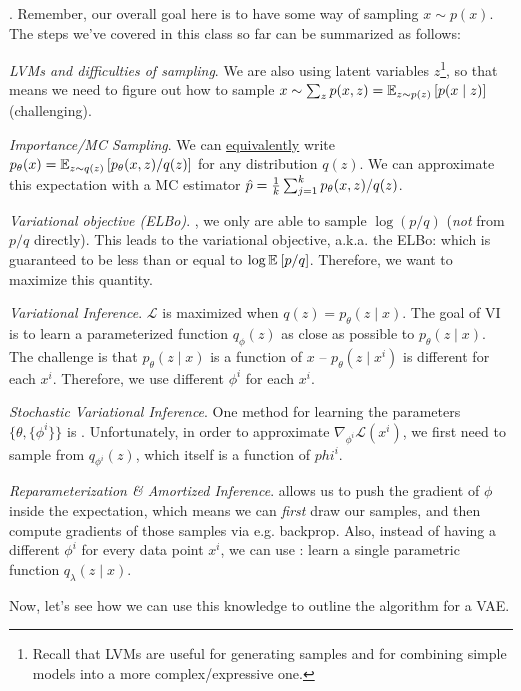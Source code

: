 \documentclass[11pt]{article}
\newcommand\myspace[1][]{\vspace{#1\bigskipamount}\Needspace{10\baselineskip}}
\newcommand\p{\Needspace{10\baselineskip} \noindent}
\newcommand\bluesec[1]{\myspace \p \blue{#1}}
\begin{document}
\bluesec{Interpretation Break}. Remember, our overall goal here is to have some way of sampling $x \sim p(x)$. The steps we've covered in this class so far can be summarized as follows:
\begin{compactenum}
	\item\textit{LVMs and difficulties of sampling}. We are also using latent variables $z$\footnote{Recall that LVMs are useful for generating samples and for combining simple models into a more complex/expressive one.}, so that means we need to figure out how to sample $x \sim \sum_z p(x, z) = \E[z \sim p(z)]{p(x \mid z)}$ (challenging). 
	
	\item \textit{Importance/MC Sampling}. We can \underline{equivalently} write $p_{\theta}(x) = \E[z \sim q(z)]{p_{\theta}(x, z) / q(z)}$ for any distribution $q(z)$. We can approximate this expectation with a MC estimator $\hat p = \inv{k} \sum_{j=1}^{k} p_{\theta}(x, z) / q(z)$. 
	
	\item \textit{Variational objective (ELBo)}. , we only are able to sample $\log(p/q)$ (\textit{not} from $p/q$ directly). This leads to the variational objective, a.k.a. the ELBo:
	which is guaranteed to be less than or equal to $\log \E{p/q}$. Therefore, we want to maximize this quantity. 
	
	\item \textit{Variational Inference}. $\mathcal L$ is maximized when $q(z) = p_{\theta}(z \mid x)$. The goal of VI is to learn a parameterized function $q_{\phi}(z)$ as close as possible to $p_{\theta}(z \mid x)$. The challenge is that $p_{\theta}(z \mid x)$ is a function of $x$ --  $p_{\theta}(z \mid x^i)$ is different for each $x^i$. Therefore, we use different  $\phi^i$ for each $x^i$. 
	
	\item \textit{Stochastic Variational Inference}. One method for learning the parameters $\{\theta, \{\phi^i\}\}$ is . Unfortunately, in order to approximate $\nabla_{\phi^i} \mathcal L(x^i)$, we first need to sample from $q_{\phi^i}(z)$, which itself is a function of $phi^i$. 
	
	\item \textit{Reparameterization \& Amortized Inference}.  allows us to push the gradient of $\phi$ inside the expectation, which means we can \textit{first} draw our samples, and then compute gradients of those samples via e.g. backprop. Also, instead of having a different $\phi^i$ for every data point $x^i$, we can use : learn a single parametric function $q_{\lambda}(z \mid x)$.
\end{compactenum}
Now, let's see how we can use this knowledge to outline the algorithm for a VAE. 
\end{document}
